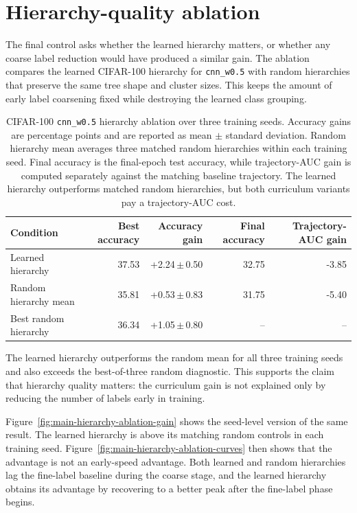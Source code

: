\documentclass[english,master,a4paper,oneside]{ppfcmthesis}
\begin{document}
\section{Hierarchy-quality ablation}

The final control asks whether the learned hierarchy matters, or whether any
coarse label reduction would have produced a similar gain. The ablation compares
the learned CIFAR-100 hierarchy for \texttt{cnn\_w0.5} with random hierarchies
that preserve the same tree shape and cluster sizes. This keeps the amount of
early label coarsening fixed while destroying the learned class grouping.

\begin{table}[htbp]
\centering
\small
\begin{tabular}{lrrrr}
\toprule
Condition & Best accuracy & Accuracy gain & Final accuracy & Trajectory-AUC gain \\
\midrule
Learned hierarchy & 37.53 & +2.24\,$\pm$\,0.50 & 32.75 & -3.85 \\
Random hierarchy mean & 35.81 & +0.53\,$\pm$\,0.83 & 31.75 & -5.40 \\
Best random hierarchy & 36.34 & +1.05\,$\pm$\,0.80 & -- & -- \\
\bottomrule
\end{tabular}
\caption{CIFAR-100 \texttt{cnn\_w0.5} hierarchy ablation over three training
seeds. Accuracy gains are percentage points and are reported as mean $\pm$
standard deviation. Random hierarchy mean averages three matched random
hierarchies within each training seed. Final accuracy is the final-epoch test
accuracy, while trajectory-AUC gain is computed separately against the matching
baseline trajectory. The learned hierarchy outperforms matched random
hierarchies, but both curriculum variants pay a trajectory-AUC cost.}
\label{tab:main-hierarchy-ablation}
\end{table}

The learned hierarchy outperforms the random mean for all three training seeds
and also exceeds the best-of-three random diagnostic. This supports the claim that
hierarchy quality matters: the curriculum gain is not explained only by reducing
the number of labels early in training.

Figure~\ref{fig:main-hierarchy-ablation-gain} shows the seed-level version of
the same result. The learned hierarchy is above its matching random controls in
each training seed. Figure~\ref{fig:main-hierarchy-ablation-curves} then shows
that the advantage is not an early-speed advantage. Both learned and random
hierarchies lag the fine-label baseline during the coarse stage, and the learned
hierarchy obtains its advantage by recovering to a better peak after the
fine-label phase begins.
\end{document}
